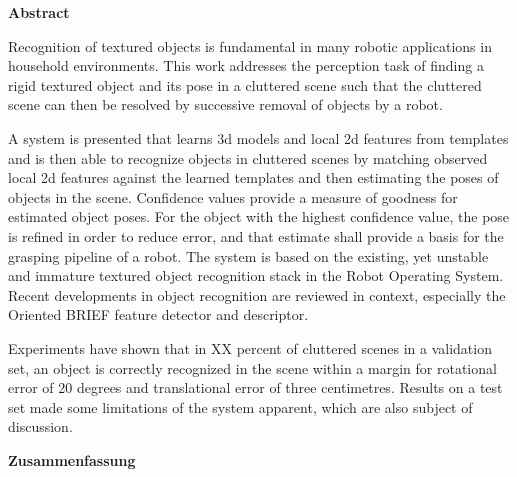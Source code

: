 

\clearemptydoublepage
{}
{}	

\vspace*{2cm}
\begin{center}
{\Large \bf Abstract}
\end{center}
\vspace{1cm}

Recognition of textured objects is fundamental in many robotic applications in
household environments. This work addresses the perception task of finding a
rigid textured object and its pose in a cluttered scene such that the cluttered
scene can then be resolved by successive removal of objects by a robot.

A system is presented that learns 3d models and local 2d features from
templates and is then able to recognize objects in cluttered scenes by matching
observed local 2d features against the learned templates and then estimating
the poses of objects in the scene. Confidence values provide a measure of
goodness for estimated object poses. For the object with the highest confidence
value, the pose is refined in order to reduce error, and that estimate shall
provide a basis for the grasping pipeline of a robot. The system is based on
the existing, yet unstable and immature textured object recognition stack in
the Robot Operating System. Recent developments in object recognition are reviewed
in context, especially the Oriented BRIEF feature detector and descriptor.

Experiments have shown that in XX percent of cluttered scenes in a validation
set, an object is correctly recognized in the scene within a margin for
rotational error of 20 degrees and translational error of three centimetres.
Results on a test set made some limitations of the system apparent, which are
also subject of discussion.

\clearemptydoublepage
{}
{}

\vspace*{2cm}
\begin{center}
{\Large \bf Zusammenfassung}
\end{center}
\vspace{1cm}


